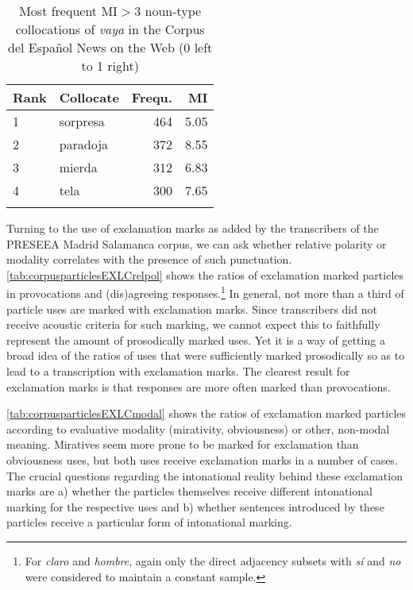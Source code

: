 \begin{table}
	\begin{tabular}{llrr}
		\lsptoprule
		Rank & Collocate & Frequ. & MI  \\\midrule
		1    & sorpresa & 464     & 5.05  \\
		2    & paradoja & 372     & 8.55  \\
		3    & mierda   & 312     & 6.83  \\
		4    & tela     & 300     & 7.65  \\
		\lspbottomrule 
	\end{tabular}
	\caption{Most frequent $\text{MI}>3$ noun-type collocations of \textit{vaya} in the Corpus del Español News on the Web (0 left to 1 right)\label{tab:corpusdelespanolVAYAnoun}}
\end{table}

Turning to the use of exclamation marks as added by the transcribers of the PRESEEA Madrid Salamanca corpus, we can ask whe\-ther relative polarity or modality correlates with the presence of such punctuation. \autoref{tab:corpusparticlesEXLCrelpol} shows the ratios of exclamation marked particles in provocations and (dis)agreeing responses.\footnote{For \textit{claro} and \textit{hombre}, again only the direct adjacency subsets with \textit{sí} and \textit{no} were considered to maintain a constant sample.} In general, not more than a third of particle uses are marked with exclamation marks. Since transcribers did not receive acoustic criteria for such marking, we cannot expect this to faithfully represent the amount of prosodically marked uses. Yet it is a way of getting a broad idea of the ratios of uses that were sufficiently marked prosodically so as to lead to a transcription with exclamation marks. The clearest result for exclamation marks is that responses are more often marked than provocations.

\autoref{tab:corpusparticlesEXLCmodal} shows the ratios of exclamation marked particles according to evaluative modality (mirativity, obviousness) or other, non-modal meaning. Miratives seem more prone to be marked for exclamation than obviousness uses, but both uses receive exclamation marks in a number of cases. The crucial questions regarding the intonational reality behind these exclamation marks are a) whether the particles themselves receive different intonational marking for the respective uses and b) whether sentences introduced by these particles receive a particular form of intonational marking.

